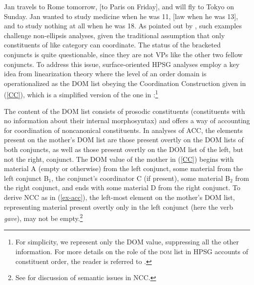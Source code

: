 {\eal
\label{ex-acc-eliptical}
\ex Jan travels to Rome tomorrow, [to Paris on Friday], and will fly to Tokyo
on Sunday. \label{acc2}
\ex Jan wanted to study medicine when he was 11, [law when he was 13],
and to study nothing at all when he was 18. \label{acc3}\zl
%
As pointed out by \citet{Beavers2004}, such examples challenge non-ellipsis analyses, given the traditional assumption that only 
constituents of like category can coordinate. The status of the bracketed conjuncts
is quite questionable, since they are not VPs like the other two fellow conjuncts.
To address this issue, surface-oriented HPSG analyses employ a key idea from linearization theory
where the level of an order domain is operationalized as the DOM list obeying the
Coordination Construction given in (\ref{CC}), which is a simplified
version of the one in \citet[(27)]{Beavers2004}:\footnote{For simplicity, we represent only the DOM value, suppressing all the other information. For more details on the role of the \textsc{dom} list in HPSG accounts of constituent order, the reader is referred to .}
%

\ea\label{CC}
\z
%
%
%
%
The content of the DOM list consists of prosodic constituents (constituents with no information about their internal morphosyntax) and offers a way of accounting for coordination of noncanonical constituents. In analyses of ACC, the elements present on the mother's DOM list are those present overtly on the DOM lists of both conjuncts, as well as those present overtly on the DOM list of the left, but not the right, conjunct. The DOM value of the mother in (\ref{CC}) begins with material A (empty or otherwise) from the left conjunct, some material from the left conjunct B$_{1}$, the conjunct's
coordinator C (if present), some material B$_{2}$
from the right conjunct, and ends with some material D from the right conjunct. To derive NCC as in (\ref{ex-acc}), the left-most element on the mother's DOM list, representing material present overtly only in the left conjunct (here the verb {\it gave}), may not be empty.\footnote{See \citet{Beavers2004} for discussion of semantic issues
in NCC.}

}
